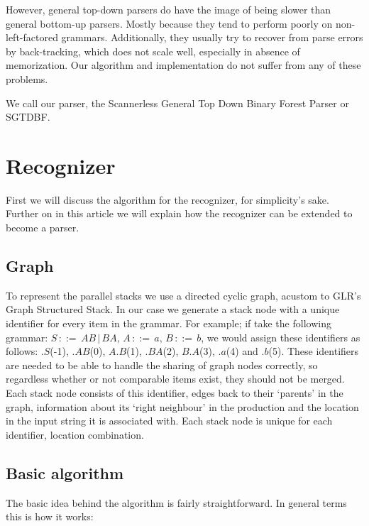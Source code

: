 \documentclass[a4paper,10pt]{article}
\begin{document}
However, general top-down parsers do have the image of being slower than general bottom-up parsers. Mostly because they tend to perform poorly on non-left-factored grammars. Additionally, they usually try to recover from parse errors by back-tracking, which does not scale well, especially in absence of memorization. Our algorithm and implementation do not suffer from any of these problems.

We call our parser, the Scannerless General Top Down Binary Forest Parser or SGTDBF.

\section{Recognizer}

First we will discuss the algorithm for the recognizer, for simplicity's sake. Further on in this article we will explain how the recognizer can be extended to become a parser.

\subsection{Graph}

To represent the parallel stacks we use a directed cyclic graph, acustom to GLR's Graph Structured Stack. In our case we generate a stack node with a unique identifier for every item in the grammar. For example; if take the following grammar: $S\,::=\,AB\,|\,BA,\,A\,::=\,a,\,B\,::=\,b$, we would assign these identifiers as follows: $.S$(-1), $.AB$(0), $A.B$(1), $.BA$(2), $B.A$(3), $.a$(4) and $.b$(5). These identifiers are needed to be able to handle the sharing of graph nodes correctly, so regardless whether or not comparable items exist, they should not be merged. Each stack node consists of this identifier, edges back to their `parents' in the graph, information about its `right neighbour' in the production and the location in the input string it is associated with. Each stack node is unique for each identifier, location combination.

\subsection{Basic algorithm}

The basic idea behind the algorithm is fairly straightforward. In general terms this is how it works:
\end{document}
